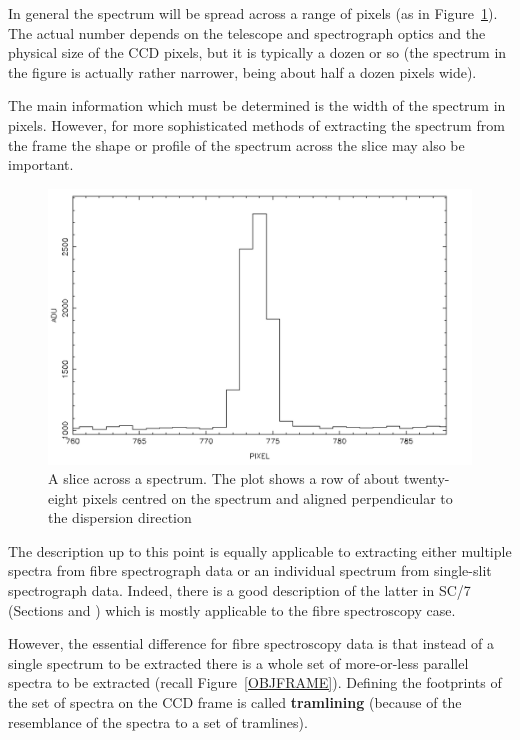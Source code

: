 \documentclass[chapters,twoside,11pt]{starlink}
\begin{document}
\begin{description}
   In general the spectrum will be spread across a range of pixels
   (as in Figure~\ref{SPSLICE}).  The actual number depends on the
   telescope and spectrograph optics and the physical size of the
   CCD pixels, but it is typically a dozen or so (the spectrum in
   the figure is actually rather narrower, being about half a dozen
   pixels wide).

   The main information which must be determined is the width of the
   spectrum in pixels.  However, for more sophisticated methods of
   extracting the spectrum from the frame the shape or profile of the
   spectrum across the slice may also be important.

\end{description}

\pagebreak
\begin{figure}[htbp]
   \centering
   \includegraphics[totalheight=4in]{sc14_spslice}
   \caption[A slice across a spectrum]{A slice across a spectrum.
    The plot shows a row of about twenty-eight pixels centred on
    the spectrum and aligned perpendicular to the dispersion
    direction
   \label{SPSLICE} }
\end{figure}

The description up to this point is equally applicable to extracting
either multiple spectra from fibre spectrograph data or an individual
spectrum from single-slit spectrograph data.  Indeed, there is a good
description of the latter in SC/7 (Sections
 and ) which
is mostly applicable to the fibre spectroscopy case.

However, the essential difference for fibre spectroscopy data is that
instead of a single spectrum to be extracted there is a whole set of
more-or-less parallel spectra to be extracted (recall
Figure~\ref{OBJFRAME}).  Defining the footprints of the set of spectra
on the CCD frame is called \textbf{tramlining} (because of the resemblance
of the spectra to a set of tramlines).
\end{document}
